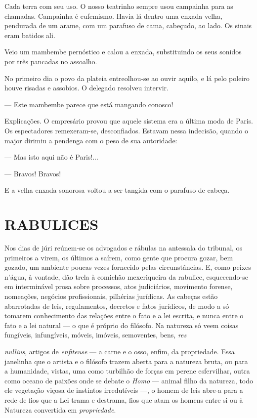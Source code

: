 Cada terra com seu uso. O nosso teatrinho sempre usou campainha para as
chamadas. Campainha é eufemismo. Havia lá dentro uma enxada velha,
pendurada de um arame, com um parafuso de cama, cabeçudo, ao lado. Os
sinais eram batidos ali.

Veio um mambembe pernóstico e calou a enxada, substituindo os seus
sonidos por três pancadas no assoalho.

No primeiro dia o povo da plateia entreolhou-se ao ouvir aquilo, e lá
pelo poleiro houve risadas e assobios. O delegado resolveu intervir.

--- Este mambembe parece que está mangando conosco!

Explicações. O empresário provou que aquele sistema era a última moda de
Paris. Os espectadores remexeram-se, desconfiados. Estavam nessa
indecisão, quando o major dirimiu a pendenga com o peso de sua
autoridade:

--- Mas isto aqui não é Paris!...

--- Bravos! Bravos!

E a velha enxada sonorosa voltou a ser tangida com o parafuso de cabeça.

\section{RABULICES}

Nos dias de júri reúnem-se os advogados e rábulas na antessala do
tribunal, os primeiros a virem, os últimos a saírem, como gente que
procura gozar, bem gozado, um ambiente poucas vezes fornecido pelas
circunstâncias. E, como peixes n'água, à vontade, dão trela à comichão
mexeriqueira da rabulice, esquecendo-se em interminável prosa sobre
processos, atos judiciários, movimento forense, nomeações, negócios
profissionais, pilhérias jurídicas. As cabeças estão abarrotadas de
leis, regulamentos, decretos e fatos jurídicos, de modo a só tomarem
conhecimento das relações entre o fato e a lei escrita, e nunca entre o
fato e a lei natural --- o que é próprio do filósofo. Na natureza só
veem coisas fungíveis, infungíveis, móveis, imóveis, semoventes, bens,
\emph{res}

\emph{nullius}, artigos de \emph{enfiteuse} --- a carne e o osso, enfim,
da propriedade. Essa janelinha que o artista e o filósofo trazem aberta
para a natureza bruta, ou para a humanidade, vistas, uma como turbilhão
de forças em perene esfervilhar, outra como oceano de paixões onde se
debate o \emph{Homo} --- animal filho da natureza, todo ele vegetação
viçosa de instintos irredutíveis ---, o homem de leis abre-a para a rede
de fios que a Lei trama e destrama, fios que atam os homens entre si ou
à Natureza convertida em \emph{propriedade}.


